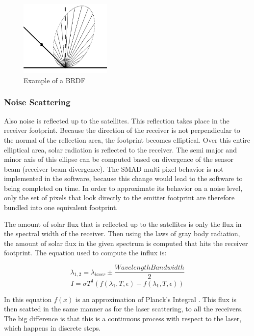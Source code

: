 \begin{figure}[ht!]
\centering
\includegraphics[width=0.4\textwidth]{chapters/img/scatter.png}
\caption{Example of a \ac{BRDF}}
\label{fig:scatter}
\end{figure}



\subsubsection{Noise Scattering}

Also noise is reflected up to the satellites. This reflection takes place in the receiver footprint. Because the direction of the receiver is not perpendicular to the normal of the reflection area, the footprint becomes elliptical. Over this entire elliptical area, solar radiation is reflected to the receiver. The semi major and minor axis of this ellipse can be computed based on divergence of the sensor beam (receiver beam divergence). The SMAD multi pixel behavior is not implemented in the software, because this change would lead to the software to being completed on time. In order to approximate its behavior on a noise level, only the set of pixels that look directly to the emitter footprint are therefore bundled into one equivalent footprint. 

The amount of solar flux that is reflected up to the satellites is only the flux in the spectral width of the receiver. Then using the laws of gray body radiation, the amount of solar flux in the given spectrum is computed that hits the receiver footprint. The equation used to compute the influx is:

\begin{equation}
	\lambda_{1,2} = \lambda _{laser} \pm \frac{Wavelength Bandwidth}{2}
\end{equation}
\begin{equation}
	I = \sigma T^4 (f(\lambda _1, T, \epsilon) - f(\lambda _1, T, \epsilon))
\end{equation}

In this equation $f(x)$ is an approximation of Planck's Integral \cite[p.~26]{rees}. This flux is then scatted in the same manner as for the laser scattering, to all the receivers. The big difference is that this is a continuous process with respect to the laser, which happens in discrete steps.

